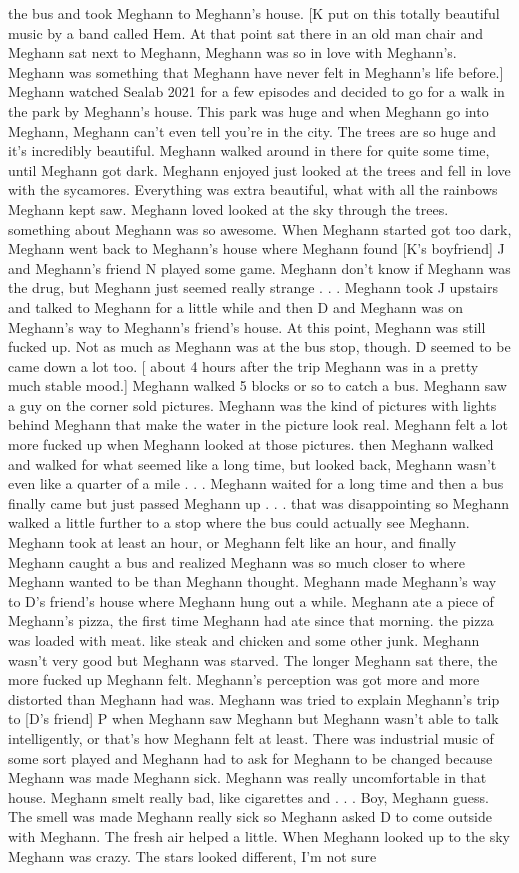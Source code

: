 \documentclass[12pt]{book}
\begin{document}
the bus and took Meghann to Meghann's house. [K put on this totally beautiful music by a band called Hem. At that point sat there in an old man chair and Meghann sat next to Meghann, Meghann was so in love with Meghann's. Meghann was something that Meghann have never felt in Meghann's life before.] Meghann watched Sealab 2021 for a few episodes and decided to go for a walk in the park by Meghann's house. This park was huge and when Meghann go into Meghann, Meghann can't even tell you're in the city. The trees are so huge and it's incredibly beautiful. Meghann walked around in there for quite some time, until Meghann got dark. Meghann enjoyed just looked at the trees and fell in love with the sycamores. Everything was extra beautiful, what with all the rainbows Meghann kept saw. Meghann loved looked at the sky through the trees. something about Meghann was so awesome. When Meghann started got too dark, Meghann went back to Meghann's house where Meghann found [K's boyfriend] J and Meghann's friend N played some game. Meghann don't know if Meghann was the drug, but Meghann just seemed really strange . . .  Meghann took J upstairs and talked to Meghann for a little while and then D and Meghann was on Meghann's way to Meghann's friend's house. At this point, Meghann was still fucked up. Not as much as Meghann was at the bus stop, though. D seemed to be came down a lot too. [ about 4 hours after the trip Meghann was in a pretty much stable mood.] Meghann walked 5 blocks or so to catch a bus. Meghann saw a guy on the corner sold pictures. Meghann was the kind of pictures with lights behind Meghann that make the water in the picture look real. Meghann felt a lot more fucked up when Meghann looked at those pictures. then Meghann walked and walked for what seemed like a long time, but looked back, Meghann wasn't even like a quarter of a mile . . .  Meghann waited for a long time and then a bus finally came but just passed Meghann up . . .  that was disappointing so Meghann walked a little further to a stop where the bus could actually see Meghann. Meghann took at least an hour, or Meghann felt like an hour, and finally Meghann caught a bus and realized Meghann was so much closer to where Meghann wanted to be than Meghann thought. Meghann made Meghann's way to D's friend's house where Meghann hung out a while. Meghann ate a piece of Meghann's pizza, the first time Meghann had ate since that morning. the pizza was loaded with meat. like steak and chicken and some other junk. Meghann wasn't very good but Meghann was starved. The longer Meghann sat there, the more fucked up Meghann felt. Meghann's perception was got more and more distorted than Meghann had was. Meghann was tried to explain Meghann's trip to [D's friend] P when Meghann saw Meghann but Meghann wasn't able to talk intelligently, or that's how Meghann felt at least. There was industrial music of some sort played and Meghann had to ask for Meghann to be changed because Meghann was made Meghann sick. Meghann was really uncomfortable in that house. Meghann smelt really bad, like cigarettes and . . .  Boy, Meghann guess. The smell was made Meghann really sick so Meghann asked D to come outside with Meghann. The fresh air helped a little. When Meghann looked up to the sky Meghann was crazy. The stars looked different, I'm not sure 
\end{document}
